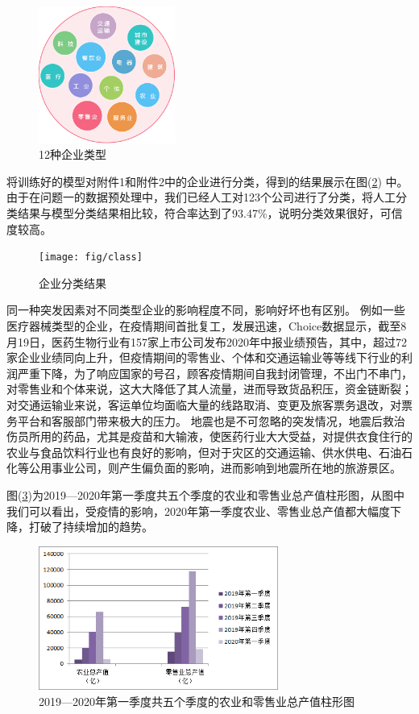 \documentclass[withoutpreface,bwprint]{cumcmthesis} %
\begin{document}
\begin{figure}[h]
	\centering
	\includegraphics[width=0.4\textwidth]{fig/company}
	\caption{12种企业类型}
	\label{fig:company}
\end{figure}

将训练好的模型对附件1和附件2中的企业进行分类，得到的结果展示在图(\ref{fig:class}) 中。由于在问题一的数据预处理中，我们已经人工对123个公司进行了分类，将人工分类结果与模型分类结果相比较，符合率达到了93.47\%，说明分类效果很好，可信度较高。
\begin{figure}[h]
	\centering
	\texttt{[image: fig/class]}
	\caption{企业分类结果}
	\label{fig:class}
\end{figure}

同一种突发因素对不同类型企业的影响程度不同，影响好坏也有区别。
例如一些医疗器械类型的企业，在疫情期间首批复工，发展迅速，Choice数据显示，截至8月19日，医药生物行业有157家上市公司发布2020年中报业绩预告，其中，超过72家企业业绩同向上升，但疫情期间的零售业、个体和交通运输业等等线下行业的利润严重下降，为了响应国家的号召，顾客疫情期间自我封闭管理，不出门不串门，对零售业和个体来说，这大大降低了其人流量，进而导致货品积压，资金链断裂；对交通运输业来说，客运单位均面临大量的线路取消、变更及旅客票务退改，对票务平台和客服部门带来极大的压力。
地震也是不可忽略的突发情况，地震后救治伤员所用的药品，尤其是疫苗和大输液，使医药行业大大受益，对提供衣食住行的农业与食品饮料行业也有良好的影响，但对于灾区的交通运输、供水供电、石油石化等公用事业公司，则产生偏负面的影响，进而影响到地震所在地的旅游景区。

图(\ref{fig:trend})为2019—2020年第一季度共五个季度的农业和零售业总产值柱形图，从图中我们可以看出，受疫情的影响，2020年第一季度农业、零售业总产值都大幅度下降，打破了持续增加的趋势。

\begin{figure}[h]
	\centering
	\includegraphics[width=0.7\textwidth]{fig/trend}
	\caption{2019—2020年第一季度共五个季度的农业和零售业总产值柱形图}
	\label{fig:trend}
\end{figure}
\end{document}
